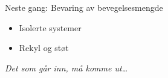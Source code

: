 \documentclass[aspectratio=169, 12pt]{beamer}
\begin{document}
\begin{frame}
\begin{center}
  \Huge{Neste gang: Bevaring av bevegelsesmengde}
  \begin{itemize}
    \item Isolerte systemer
    \item Rekyl og støt
  \end{itemize}
  \vspace{6mm}
  {\normalsize\itshape Det som går inn, må komme ut\ldots}
\end{center}
\end{frame}
\end{document}
